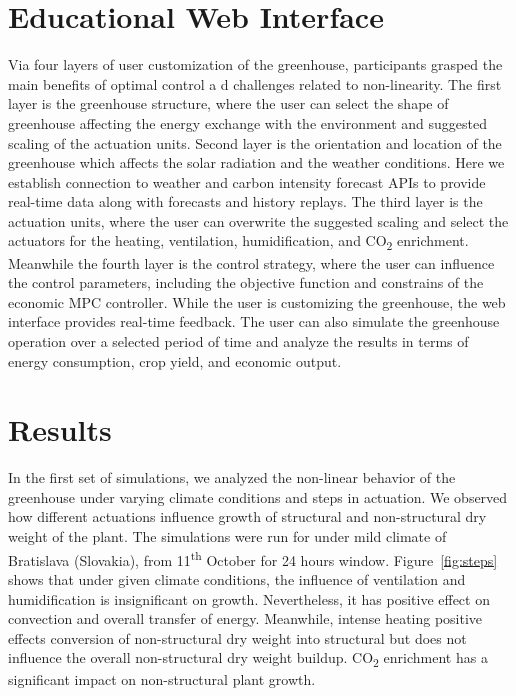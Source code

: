 \documentclass[conference]{IEEEtran}
\begin{document}
\section{Educational Web Interface}
Via four layers of user customization of the greenhouse, participants grasped the main benefits of optimal control a d challenges related to non-linearity. The first layer is the greenhouse structure, where the user can select the shape of greenhouse affecting the energy exchange with the environment and suggested scaling of the actuation units. Second layer is the orientation and location of the greenhouse which affects the solar radiation and the weather conditions. Here we establish connection to weather and carbon intensity forecast APIs to provide real-time data along with forecasts and history replays. The third layer is the actuation units, where the user can overwrite the suggested scaling and select the actuators for the heating, ventilation, humidification, and CO\textsubscript{2} enrichment. Meanwhile the fourth layer is the control strategy, where the user can influence the control parameters, including the objective function and constrains of the economic MPC controller. While the user is customizing the greenhouse, the web interface provides real-time feedback. The user can also simulate the greenhouse operation over a selected period of time and analyze the results in terms of energy consumption, crop yield, and economic output.

\section{Results}
In the first set of simulations, we analyzed the non-linear behavior of the greenhouse under varying climate conditions and steps in actuation. We observed how different actuations influence growth of structural and non-structural dry weight of the plant. The simulations were run for under mild climate of Bratislava (Slovakia), from 11\textsuperscript{th} October for 24 hours window. Figure~\ref{fig:steps} shows that under given climate conditions, the influence of ventilation and humidification is insignificant on growth. Nevertheless, it has positive effect on convection and overall transfer of energy. Meanwhile, intense heating positive effects conversion of non-structural dry weight into structural but does not influence the overall non-structural dry weight buildup. CO\textsubscript{2} enrichment has a significant impact on non-structural plant growth.
\end{document}
